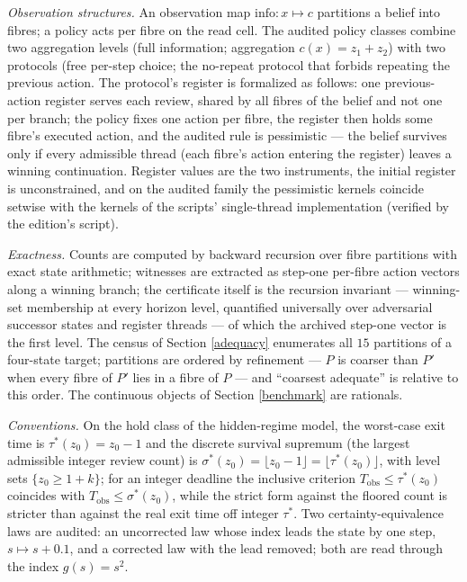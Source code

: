 \documentclass[10pt,twocolumn]{article}
\theoremstyle{definition}
\begin{document}
\emph{Observation structures.} An observation map
\(\mathrm{info}: x \mapsto c\) partitions a belief into fibres; a policy
acts per fibre on the read cell. The audited policy classes combine two
aggregation levels (full information; aggregation
\(c(x) = z_1 + z_2\)) with two protocols (free per-step choice; the
no-repeat protocol that forbids repeating the previous action. The
protocol's register is formalized as follows: one previous-action register
serves each review, shared by all fibres of the belief and not one per
branch; the policy fixes one action per fibre, the register then holds
some fibre's executed action, and the audited rule is pessimistic --- the
belief survives only if every admissible thread (each fibre's action
entering the register) leaves a winning continuation. Register values are
the two instruments, the initial register is unconstrained, and on the
audited family the pessimistic kernels coincide setwise with the kernels
of the scripts' single-thread implementation (verified by the edition's
script).

\emph{Exactness.} Counts are computed by backward recursion over fibre
partitions with exact state arithmetic; witnesses are extracted as step-one per-fibre action vectors along a winning branch; the certificate itself is the recursion invariant --- winning-set membership at every horizon level, quantified universally over adversarial successor states and register threads --- of which the archived step-one vector is the first level. The census of
Section \ref{adequacy} enumerates all \(15\) partitions of a four-state
target; partitions are ordered by refinement --- \(P\) is coarser than
\(P'\) when every fibre of \(P'\) lies in a fibre of \(P\) --- and
``coarsest adequate'' is relative to this order. The continuous objects of Section \ref{benchmark} are rationals.

\emph{Conventions.} On the hold class of the hidden-regime model, the
worst-case exit time is \(\tau^{*}(z_0) = z_0 - 1\) and the discrete
survival supremum (the largest admissible integer review count) is
\(\sigma^{*}(z_0) = \lfloor z_0 - 1 \rfloor = \lfloor \tau^{*}(z_0)
\rfloor\), with level sets \(\{z_0 \ge 1 + k\}\); for an integer deadline
the inclusive criterion \(T_{\mathrm{obs}} \le \tau^{*}(z_0)\) coincides
with \(T_{\mathrm{obs}} \le \sigma^{*}(z_0)\), while the strict form
against the floored count is stricter than against the real exit time off
integer \(\tau^{*}\). Two
certainty-equivalence laws are audited: an uncorrected law whose index
leads the state by one step, \(s \mapsto s + 0.1\), and a corrected law
with the lead removed; both are read through the index \(g(s) = s^{2}\).
\end{document}
